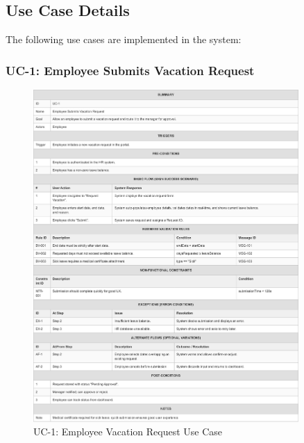 \documentclass[12pt,a4paper]{article}
\begin{document}
\subsection{Use Case Details}
The following use cases are implemented in the system:

\subsubsection{UC-1: Employee Submits Vacation Request}
\begin{figure}[H]
\centering
\includegraphics[width=0.9\textwidth]{Use-Cases/UC-1-Employee-Vacation-Request/UC-1-Employee-Vacation-Request-1.png}
\caption{UC-1: Employee Vacation Request Use Case}
\label{fig:uc1}
\end{figure}
\end{document}
